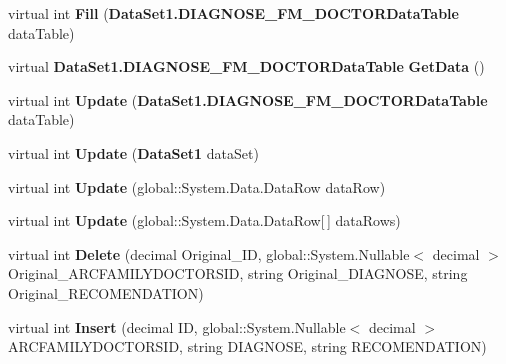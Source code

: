 \begin{CompactItemize}
\item 
virtual int \textbf{Fill} ({\bf DataSet1.DIAGNOSE\_\-FM\_\-DOCTORDataTable} dataTable)\label{class_automatic_medical_system_1_1_data_set1_table_adapters_1_1_d_i_a_g_n_o_s_e___f_m___d_o_c_t_o_r_table_adapter_cebbe799aa2844a4a490a7aca44d3d12}

\item 
virtual {\bf DataSet1.DIAGNOSE\_\-FM\_\-DOCTORDataTable} \textbf{GetData} ()\label{class_automatic_medical_system_1_1_data_set1_table_adapters_1_1_d_i_a_g_n_o_s_e___f_m___d_o_c_t_o_r_table_adapter_352b38ae66b56a94c982606be6591108}

\item 
virtual int \textbf{Update} ({\bf DataSet1.DIAGNOSE\_\-FM\_\-DOCTORDataTable} dataTable)\label{class_automatic_medical_system_1_1_data_set1_table_adapters_1_1_d_i_a_g_n_o_s_e___f_m___d_o_c_t_o_r_table_adapter_6ac6c1fbe4d351c63a5f9626ce619aaf}

\item 
virtual int \textbf{Update} ({\bf DataSet1} dataSet)\label{class_automatic_medical_system_1_1_data_set1_table_adapters_1_1_d_i_a_g_n_o_s_e___f_m___d_o_c_t_o_r_table_adapter_13b69cf81477565e0c285c48b53bd68e}

\item 
virtual int \textbf{Update} (global::System.Data.DataRow dataRow)\label{class_automatic_medical_system_1_1_data_set1_table_adapters_1_1_d_i_a_g_n_o_s_e___f_m___d_o_c_t_o_r_table_adapter_900860b2e97f7cfa7a4a3edd9e3e364c}

\item 
virtual int \textbf{Update} (global::System.Data.DataRow[$\,$] dataRows)\label{class_automatic_medical_system_1_1_data_set1_table_adapters_1_1_d_i_a_g_n_o_s_e___f_m___d_o_c_t_o_r_table_adapter_618e35dd6c095b9eae241482f57f613b}

\item 
virtual int \textbf{Delete} (decimal Original\_\-ID, global::System.Nullable$<$ decimal $>$ Original\_\-ARCFAMILYDOCTORSID, string Original\_\-DIAGNOSE, string Original\_\-RECOMENDATION)\label{class_automatic_medical_system_1_1_data_set1_table_adapters_1_1_d_i_a_g_n_o_s_e___f_m___d_o_c_t_o_r_table_adapter_a098813900c318148b921989f2fb9dea}

\item 
virtual int \textbf{Insert} (decimal ID, global::System.Nullable$<$ decimal $>$ ARCFAMILYDOCTORSID, string DIAGNOSE, string RECOMENDATION)\label{class_automatic_medical_system_1_1_data_set1_table_adapters_1_1_d_i_a_g_n_o_s_e___f_m___d_o_c_t_o_r_table_adapter_e863bc7ae9ce2e5d0ef668676c7260b1}


\end{CompactItemize}
